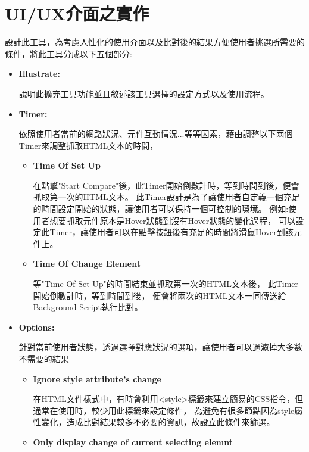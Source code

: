 \section{UI/UX介面之實作}\label{s3.5}
設計此工具，為考慮人性化的使用介面以及比對後的結果方便使用者挑選所需要的條件，將此工具分成以下五個部分:
\begin{itemize}
    \item\textbf{Illustrate:}
    
    說明此擴充工具功能並且敘述該工具選擇的設定方式以及使用流程。

    \item\textbf{Timer:}
    
    依照使用者當前的網路狀況、元件互動情況...等等因素，藉由調整以下兩個Timer來調整抓取HTML文本的時間，

    \begin{itemize}
        \item\textbf{Time Of Set Up}
        
        在點擊"Start Compare"後，此Timer開始倒數計時，等到時間到後，便會抓取第一次的HTML文本。
        此Timer設計是為了讓使用者自定義一個充足的時間設定開始的狀態，讓使用者可以保持一個可控制的環境。
        例如:使用者想要抓取元件原本是Hover狀態到沒有Hover狀態的變化過程，
        可以設定此Timer，讓使用者可以在點擊按鈕後有充足的時間將滑鼠Hover到該元件上。

        \item\textbf{Time Of Change Element}
        
        等"Time Of Set Up"的時間結束並抓取第一次的HTML文本後，
        此Timer開始倒數計時，等到時間到後，
        便會將兩次的HTML文本一同傳送給Background Script執行比對。
 
    \end{itemize}
    
    \item\textbf{Options:}
    
    針對當前使用者狀態，透過選擇對應狀況的選項，讓使用者可以過濾掉大多數不需要的結果

    \begin{itemize}
        \item\textbf{Ignore style attribute's change}
 
        在HTML文件樣式中，有時會利用<style>標籤來建立簡易的CSS指令，但通常在使用時，較少用此標籤來設定條件，
        為避免有很多節點因為style屬性變化，造成比對結果較多不必要的資訊，故設立此條件來篩選。

        \item\textbf{Only display change of current selecting elemnt}
        

\end{itemize}
\end{itemize}

